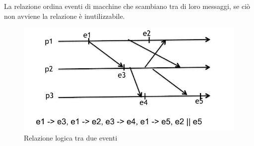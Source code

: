\documentclass[12pt]{article}
\begin{document}
		   La relazione ordina eventi di macchine che scambiano tra di loro messaggi, se ciò non avviene la relazione è inutilizzabile.	
		   \begin{figure}[h!]
		   	\centering
		   	\includegraphics[scale=0.45]{img/logclock.png}
		   	\caption{Relazione logica tra due eventi}
		   \end{figure}
	   
\end{document}
